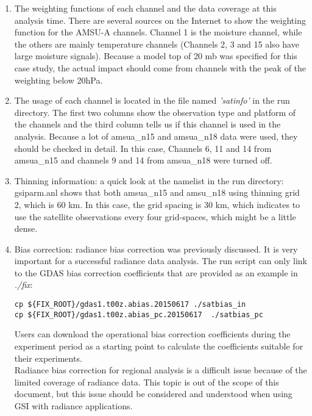 \begin{enumerate}
\item The weighting functions of each channel and the data coverage at this analysis time.  There are several sources on the Internet to show the weighting function for the AMSU-A channels. Channel 1 is the moisture channel, while the others are mainly temperature channels (Channels 2, 3 and 15 also have large moisture signals).  Because a model top of 20 mb was specified for this case study, the actual impact should come from channels with the peak of the weighting below 20hPa.

\item The usage of each channel is located in the file named  \textit{'satinfo'} in the run directory.  The first two columns show the observation type and platform of the channels and the third column tells us if this channel is used in the analysis.  Because a lot of amsua\_n15 and amsua\_n18 data were used, they should be checked in detail.  In this case, Channels 6, 11 and 14 from amsua\_n15 and channels 9 and 14 from amsua\_n18 were turned off. 

\item Thinning information: a quick look at the namelist in the run directory: gsiparm.anl shows that both amsua\_n15 and amsu\_n18 using thinning grid 2, which is 60 km.  In this case, the grid spacing is 30 km, which indicates to use the satellite observations every four grid-spaces, which might be a little dense. 


\item Bias correction: radiance bias correction was previously discussed. It is very important for a successful radiance data analysis. The run script can only link to the GDAS bias correction coefficients that are provided as an example in \textit{./fix}:

\begin{scriptsize}
\begin{verbatim}
cp ${FIX_ROOT}/gdas1.t00z.abias.20150617 ./satbias_in
cp ${FIX_ROOT}/gdas1.t00z.abias_pc.20150617  ./satbias_pc
\end{verbatim}
\end{scriptsize}

Users can download the operational bias correction coefficients during the experiment period as a starting point to calculate the coefficients suitable for their experiments. \\

Radiance bias correction for regional analysis is a difficult issue because of the limited coverage of radiance data.  This topic is out of the scope of this document, but this issue should be considered and understood when using GSI with radiance applications. 
\end{enumerate}

